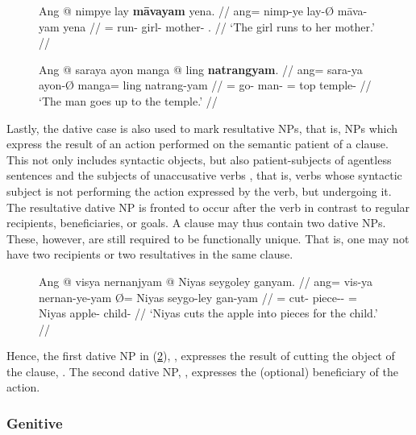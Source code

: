 \begin{figure}[h]
\pex
\a\label{ex:datloc}\begingl
	\gla Ang @ nimpye lay \textbf{māvayam} yena. //
	\glb ang= nimp-ye lay-Ø māva-yam yena //
	\glc \AgtT{}= run-\TsgF{} girl-\Top{} mother-\Dat{} \TsgF{}.\Gen{} //
	\glft `The girl runs to her mother.' //
\endgl

\a\label{ex:datlocprep}\begingl
	\gla Ang @ saraya ayon manga @ ling \textbf{natrangyam}. //
	\glb ang= sara-ya ayon-Ø manga= ling natrang-yam //
	\glc \AgtT{}= go-\TsgM{} man-\Top{} \Dir{}= top temple-\Dat{} //
	\glft `The man goes up to the temple.' //
\endgl
\xe
\end{figure}

Lastly, the dative case is also used to mark resultative NPs, that is, NPs
which express the result of an action performed on the semantic patient of a
clause. This not only includes syntactic objects, but also patient-subjects of
agentless sentences and the subjects of unaccusative verbs
\citep{perlmutter1978}, that is, verbs whose syntactic subject is not
performing the action expressed by the verb, but undergoing it. The resultative
dative NP is fronted to occur after the verb in contrast to regular recipients,
beneficiaries, or goals. A clause may thus contain two dative NPs. These,
however, are still required to be functionally unique. That is, one may not
have two recipients or two resultatives in the same clause.

\begin{figure}[h]
\ex\label{ex:resultdat}\begingl
	\gla Ang @ visya nernanjyam {} @ Niyas seygoley ganyam. //
	\glb ang= vis-ya nernan-ye-yam Ø= Niyas seygo-ley gan-yam //
	\glc \AgtT{}= cut-\TsgM{} piece-\Pl{}-\Dat{} \Top{}= Niyas apple-\PargI{}
		child-\Dat{} //
	\glft `Niyas cuts the apple into pieces for the child.' //
\endgl\xe
\end{figure}

Hence, the first dative NP in (\ref{ex:resultdat}),
, expresses the result of cutting
the object of the clause, . The second dative
NP, , expresses the (optional) beneficiary
of the action.


\subsubsection{Genitive}
\label{subsubsec:genitive}

